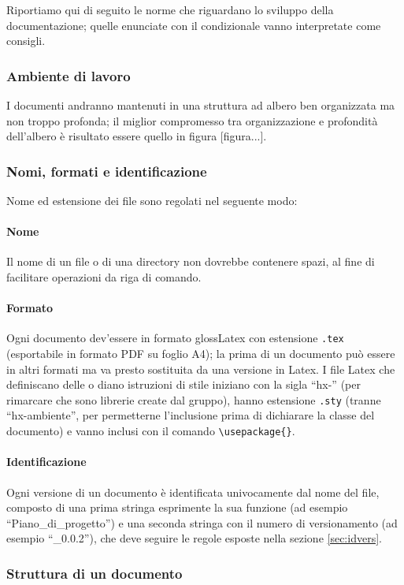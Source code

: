 Riportiamo qui di seguito le norme che riguardano lo sviluppo della documentazione; quelle enunciate con il condizionale vanno interpretate come consigli.

\subsubsection{Ambiente di lavoro} I documenti andranno mantenuti in una struttura ad albero ben organizzata ma non troppo profonda; il miglior compromesso tra organizzazione e profondità dell'albero è risultato essere quello in figura [figura...].

\subsubsection{Nomi, formati e identificazione} Nome ed estensione dei file sono regolati nel seguente modo:
\paragraph{Nome} Il nome di un file o di una directory non dovrebbe contenere spazi, al fine di facilitare operazioni da riga di comando.
\paragraph{Formato} Ogni documento dev'essere in formato gloss{Latex} con estensione \texttt{.tex} (esportabile in formato PDF su foglio A4); la prima  di un documento può essere in altri formati ma va presto sostituita da una versione in Latex. I file Latex che definiscano delle  o diano istruzioni di stile iniziano con la sigla “hx-” (per rimarcare che sono librerie create dal gruppo), hanno estensione \texttt{.sty} (tranne “hx-ambiente”, per permetterne l'inclusione prima di dichiarare la classe del documento) e vanno inclusi con il comando \texttt{\textbackslash usepackage\{\}}.
\paragraph{Identificazione} Ogni versione di un documento è identificata univocamente dal nome del file, composto di una prima stringa esprimente la sua funzione (ad esempio “Piano\_di\_progetto”) e una seconda stringa con il numero di versionamento (ad esempio “\_0.0.2”), che deve seguire le regole esposte nella sezione \ref{sec:idvers}.

\subsubsection{Struttura di un documento}

